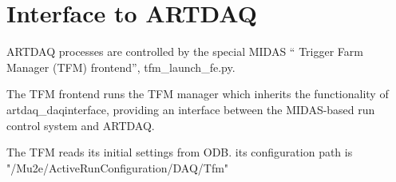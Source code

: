 \section{Interface to ARTDAQ}

ARTDAQ processes are controlled by the special MIDAS ``
Trigger Farm Manager (TFM) frontend'', tfm\_launch\_fe.py.

The TFM frontend runs the TFM manager which inherits the functionality
of artdaq\_daqinterface, providing an interface between the MIDAS-based
run control system and ARTDAQ.

The TFM reads its initial settings from ODB. its configuration path is "/Mu2e/ActiveRunConfiguration/DAQ/Tfm"




